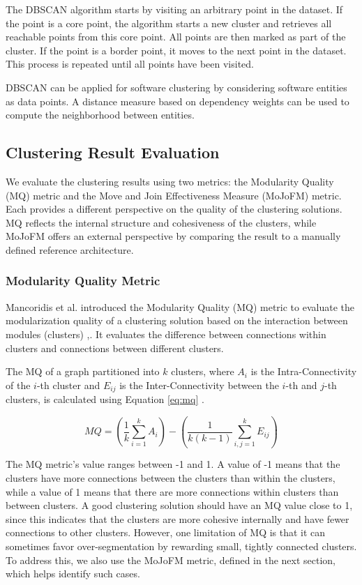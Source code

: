 \documentclass{ieeeaccess}
\begin{document}
The DBSCAN algorithm starts by visiting an arbitrary point in the dataset. If the point is a core point, the algorithm starts a new cluster and retrieves all reachable points from this core point. All points are then marked as part of the cluster. If the point is a border point, it moves to the next point in the dataset. This process is repeated until all points have been visited.

DBSCAN can be applied for software clustering by considering software entities as data points. A distance measure based on dependency weights can be used to compute the neighborhood between entities.

\subsection{Clustering Result Evaluation}
\label{subsec:evaluation_def}

We evaluate the clustering results using two metrics: the Modularity Quality (MQ) metric and the Move and Join Effectiveness Measure (MoJoFM) metric. Each provides a different perspective on the quality of the clustering solutions. MQ reflects the internal structure and cohesiveness of the clusters, while MoJoFM offers an external perspective by comparing the result to a manually defined reference architecture.

\subsubsection{Modularity Quality Metric}
\label{subsec:mq}

Mancoridis et al. introduced the Modularity Quality (MQ) metric to evaluate the modularization quality of a clustering solution based on the interaction between modules (clusters) \cite{b101},\cite{b10}. It evaluates the difference between connections within clusters and connections between different clusters.

The MQ of a graph partitioned into \( k \) clusters, where \( A_i \) is the Intra-Connectivity of the \( i \)-th cluster and \( E_{ij} \) is the Inter-Connectivity between the \( i \)-th and \( j \)-th clusters, is calculated using Equation \eqref{eq:mq} \cite{b2}.

\begin{equation}
MQ = \left( \frac{1}{k} \sum_{i=1}^{k} A_i \right) - \left( \frac{1}{k(k-1)} \sum_{i,j=1}^{k} E_{ij} \right)
\label{eq:mq}
\end{equation}

The MQ metric's value ranges between -1 and 1. A value of -1 means that the clusters have more connections between the clusters than within the clusters, while a value of 1 means that there are more connections within clusters than between clusters. A good clustering solution should have an MQ value close to 1, since this indicates that the clusters are more cohesive internally and have fewer connections to other clusters. However, one limitation of MQ is that it can sometimes favor over-segmentation by rewarding small, tightly connected clusters. To address this, we also use the MoJoFM metric, defined in the next section, which helps identify such cases.
\end{document}
